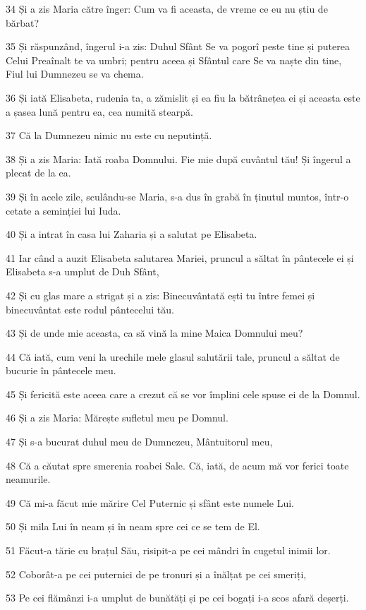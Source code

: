 \par 34 Și a zis Maria către înger: Cum va fi aceasta, de vreme ce eu nu știu de bărbat?
\par 35 Și răspunzând, îngerul i-a zis: Duhul Sfânt Se va pogorî peste tine și puterea Celui Preaînalt te va umbri; pentru aceea și Sfântul care Se va naște din tine, Fiul lui Dumnezeu se va chema.
\par 36 Și iată Elisabeta, rudenia ta, a zămislit și ea fiu la bătrânețea ei și aceasta este a șasea lună pentru ea, cea numită stearpă.
\par 37 Că la Dumnezeu nimic nu este cu neputință.
\par 38 Și a zis Maria: Iată roaba Domnului. Fie mie după cuvântul tău! Și îngerul a plecat de la ea.
\par 39 Și în acele zile, sculându-se Maria, s-a dus în grabă în ținutul muntos, într-o cetate a seminției lui Iuda.
\par 40 Și a intrat în casa lui Zaharia și a salutat pe Elisabeta.
\par 41 Iar când a auzit Elisabeta salutarea Mariei, pruncul a săltat în pântecele ei și Elisabeta s-a umplut de Duh Sfânt,
\par 42 Și cu glas mare a strigat și a zis: Binecuvântată ești tu între femei și binecuvântat este rodul pântecelui tău.
\par 43 Și de unde mie aceasta, ca să vină la mine Maica Domnului meu?
\par 44 Că iată, cum veni la urechile mele glasul salutării tale, pruncul a săltat de bucurie în pântecele meu.
\par 45 Și fericită este aceea care a crezut că se vor împlini cele spuse ei de la Domnul.
\par 46 Și a zis Maria: Mărește sufletul meu pe Domnul.
\par 47 Și s-a bucurat duhul meu de Dumnezeu, Mântuitorul meu,
\par 48 Că a căutat spre smerenia roabei Sale. Că, iată, de acum mă vor ferici toate neamurile.
\par 49 Că mi-a făcut mie mărire Cel Puternic și sfânt este numele Lui.
\par 50 Și mila Lui în neam și în neam spre cei ce se tem de El.
\par 51 Făcut-a tărie cu brațul Său, risipit-a pe cei mândri în cugetul inimii lor.
\par 52 Coborât-a pe cei puternici de pe tronuri și a înălțat pe cei smeriți,
\par 53 Pe cei flămânzi i-a umplut de bunătăți și pe cei bogați i-a scos afară deșerți.
